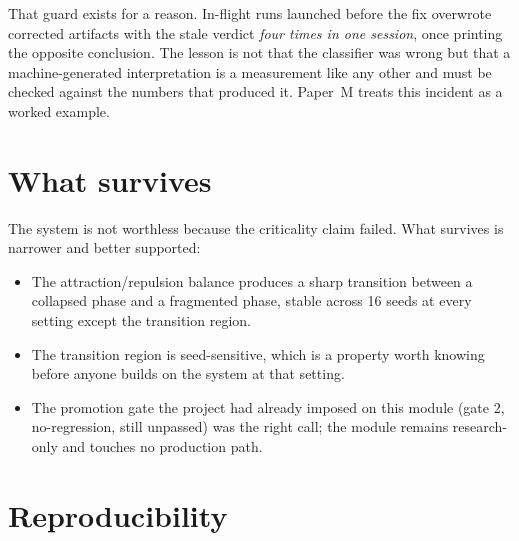 \documentclass[11pt]{article}
\begin{document}
That guard exists for a reason. In-flight runs launched before the fix
overwrote corrected artifacts with the stale verdict \emph{four times in one
session}, once printing the opposite conclusion. The lesson is not that the
classifier was wrong but that a machine-generated interpretation is a
measurement like any other and must be checked against the numbers that
produced it. Paper~M treats this incident as a worked example.

\section{What survives}

The system is not worthless because the criticality claim failed. What
survives is narrower and better supported:

\begin{itemize}
\item The attraction/repulsion balance produces a sharp transition between
  a collapsed phase and a fragmented phase, stable across 16 seeds at every
  setting except the transition region.
\item The transition region is seed-sensitive, which is a property worth
  knowing before anyone builds on the system at that setting.
\item The promotion gate the project had already imposed on this module
  (gate 2, no-regression, still unpassed) was the right call; the module
  remains research-only and touches no production path.
\end{itemize}

\section{Reproducibility}
\end{document}
